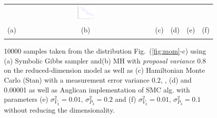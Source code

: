 \documentclass{article}
\newcommand{\nn}{0.16}
\begin{document}
\begin{figure}[t!]
\begin{center}
\begin{tabular}{cccccc}
& \hspace{-3mm} \includegraphics[width=\nn\textwidth]{Figs2/col_c_ang_10000_01_001}
\vspace{-1.5mm}
\\
   \hspace{-5mm} \footnotesize(a) 
& \hspace{-4mm} \footnotesize(b) 
& \hspace{-3mm} \footnotesize(c) 
&\hspace{-1mm} \footnotesize(d) 
&\hspace{-1mm} \footnotesize(e) 
&\hspace{-1mm} \footnotesize(f)\\
\multicolumn{6}{c}{}
\end{tabular}
\end{center}
\vspace{-8mm}
\caption{\footnotesize
10000 samples taken from the distribution Fig.~(\ref{fig:mom}-c)
using (a) Symbolic Gibbs sampler and(b) MH with \emph{proposal variance} 0.8 
on the reduced-dimension model as well as  
(c) Hamiltonian Monte Carlo (Stan) with a measurement error variance 0.2, 
, (d) and 0.00001 as well as Anglican implementation of SMC alg. with %
parameters (e)
$\sigma^2_{V_2} = 0.01$, $\sigma^2_{P_3} = 0.2$ and 
(f) $\sigma^2_{V_2} = 0.01$, $\sigma^2_{P_3} = 0.1$
without reducing the dimensionality.
}
\label{fig:mom2}
\vspace{-4mm}
\end{figure}
\end{document}
